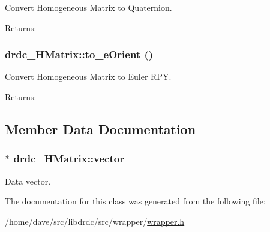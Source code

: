 Convert Homogeneous Matrix to Quaternion. 

\begin{Desc}
\item[Returns:]\end{Desc}
\hypertarget{classdrdc__HMatrix_57523497b807ffcc61239f4b1a577aa1}{
\subsubsection[to\_\-eOrient]{ drdc\_\-HMatrix::to\_\-eOrient ()}}
\label{classdrdc__HMatrix_57523497b807ffcc61239f4b1a577aa1}


Convert Homogeneous Matrix to Euler RPY. 

\begin{Desc}
\item[Returns:]\end{Desc}


\subsection{Member Data Documentation}
\hypertarget{classdrdc__HMatrix_c37eb823c50302c2c53c1be325373f0c}{
\subsubsection[vector]{$\ast$ {\bf drdc\_\-HMatrix::vector}}}
\label{classdrdc__HMatrix_c37eb823c50302c2c53c1be325373f0c}


Data vector. 



The documentation for this class was generated from the following file:\begin{CompactItemize}
\item 
/home/dave/src/libdrdc/src/wrapper/\hyperlink{wrapper_8h}{wrapper.h}\end{CompactItemize}
